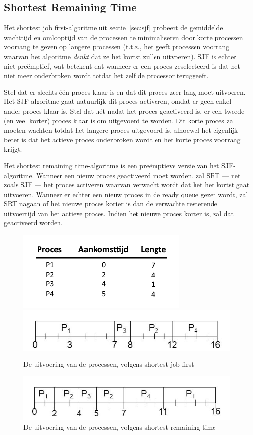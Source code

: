 \subsection{Shortest Remaining Time}

Het shortest job first-algoritme uit sectie~\ref{sec:sjf} probeert de gemiddelde wachttijd en omlooptijd van de processen te minimaliseren door korte processen voorrang te geven op langere processen (t.t.z., het geeft processen voorrang waarvan het algoritme \emph{denkt} dat ze het kortst zullen uitvoeren). SJF is echter niet-pre\"emptief, wat betekent dat wanneer er een proces geselecteerd is dat het niet meer onderbroken wordt totdat het zelf de processor teruggeeft.

Stel dat er slechts \'e\'en proces klaar is en dat dit proces zeer lang moet uitvoeren. Het SJF-algoritme gaat natuurlijk dit proces activeren, omdat er geen enkel ander proces klaar is. Stel dat n\'et nadat het proces geactiveerd is, er een tweede (en veel korter) proces klaar is om uitgevoerd te worden. Dit korte proces zal moeten wachten totdat het langere proces uitgevoerd is, alhoewel het eigenlijk beter is dat het actieve proces onderbroken wordt en het korte proces voorrang krijgt.

Het shortest remaining time-algoritme is een pre\"emptieve versie van het SJF-algoritme. Wanneer een nieuw proces geactiveerd moet worden, zal SRT --- net zoals SJF --- het proces activeren waarvan verwacht wordt dat het het kortst gaat uitvoeren. Wanneer er echter een nieuw proces in de ready queue gezet wordt, zal SRT nagaan of het nieuwe proces korter is dan de verwachte resterende uitvoertijd van het actieve proces. Indien het nieuwe proces korter is, zal dat geactiveerd worden.

\begin{figure}
\centering
  \includegraphics[width=0.5\linewidth]{images/srtsjfvgl-1.png}
  \includegraphics[width=0.75\linewidth]{images/srtsjfvgl-sjf.png}
  \caption{De uitvoering van de processen, volgens shortest job first}\label{fig:execsjf}
  \includegraphics[width=0.75\linewidth]{images/srtsjfvgl-srt.png}
  \caption{De uitvoering van de processen, volgens shortest remaining time}\label{fig:execsrt}
\end{figure}

